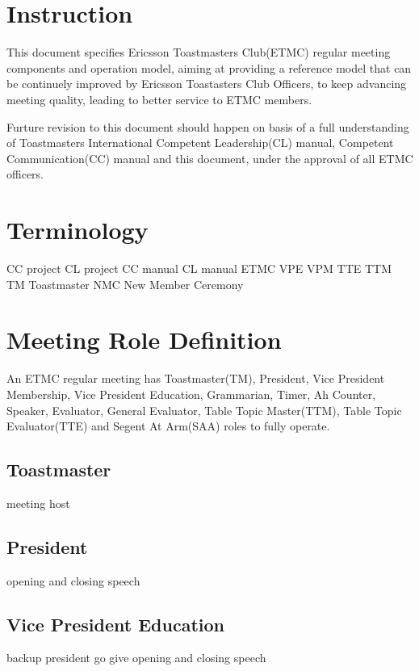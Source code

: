 
\section{Instruction}

This document specifies Ericsson Toastmasters Club(ETMC) regular meeting 
components and operation model, aiming at providing a reference model
that can be continuely improved by Ericsson Toastasters Club Officers, 
to keep advancing meeting quality, leading to better service to ETMC 
members.

Furture revision to this document should happen on basis of a full 
understanding of Toastmasters International Competent Leadership(CL)
manual, Competent Communication(CC) manual and this document, under
the approval of all ETMC officers.

\section{Terminology}

CC project
CL project
CC manual   
CL manual
ETMC
VPE
VPM
TTE
TTM
TM   Toastmaster
NMC  New Member Ceremony



\section{Meeting Role Definition}

An ETMC regular meeting has Toastmaster(TM), President, Vice President 
Membership, Vice President Education, Grammarian, Timer, Ah Counter,
Speaker, Evaluator, General Evaluator, Table Topic Master(TTM), Table 
Topic Evaluator(TTE) and Segent At Arm(SAA) roles to fully operate.  

\subsection{Toastmaster}
meeting host

\subsection{President}
opening and closing speech

\subsection{Vice President Education}
backup president go give opening and closing speech

